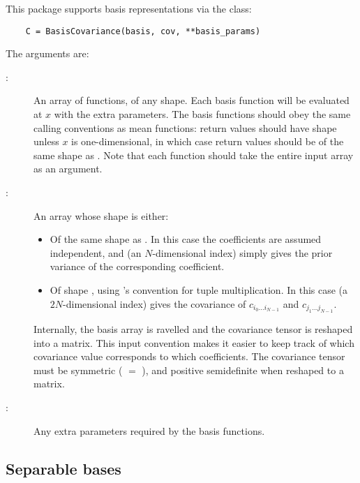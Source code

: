 \documentclass[article]{jss}
\begin{document}
This package supports basis representations via the  class:
\begin{verbatim}
    C = BasisCovariance(basis, cov, **basis_params)
\end{verbatim}
The arguments are:
\begin{description}
    \item[:] An array of functions, of any shape. Each basis function will be evaluated at $x$ with the extra parameters. The basis functions should obey the same calling conventions as mean functions: return values should have shape  unless $x$ is one-dimensional, in which case return values should be of the same shape as . Note that each function should take the entire input array as an argument.
    \item[:] An array whose shape is either:
        \begin{itemize}
            \item Of the same shape as . In this case the coefficients are assumed independent, and  (an $N$-dimensional index) simply gives the prior variance of the corresponding coefficient.
            \item Of shape , using 's convention for tuple multiplication. In this case  (a $2N$-dimensional index) gives the covariance of $c_{i_0\ldots i_{N-1}}$ and $c_{j_1\ldots j_{N-1}}$.
        \end{itemize}
        Internally, the basis array is ravelled and the covariance tensor is reshaped into a matrix. This input convention makes it easier to keep track of which covariance value corresponds to which coefficients. The covariance tensor must be symmetric ( $=$ ), and positive semidefinite when reshaped to a matrix.
    \item[:] Any extra parameters required by the basis functions.
\end{description}

\subsection{Separable bases}
\end{document}
